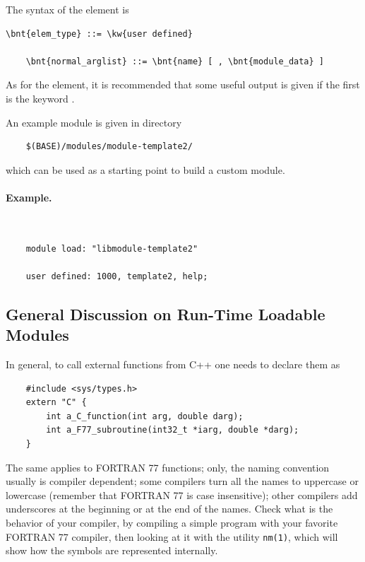 The syntax of the  element is
\begin{Verbatim}[commandchars=\\\{\}]
    \bnt{elem_type} ::= \kw{user defined}

    \bnt{normal_arglist} ::= \bnt{name} [ , \bnt{module_data} ]
\end{Verbatim}
As for the  element, it is recommended that 
some useful output is given if the first 
is the keyword .

An example module is given in directory
\begin{verbatim}
    $(BASE)/modules/module-template2/
\end{verbatim}
which can be used as a starting point to build a custom module.

\paragraph{Example.} \
\begin{verbatim}
    module load: "libmodule-template2"

    user defined: 1000, template2, help;
\end{verbatim}



\subsection{General Discussion on Run-Time Loadable Modules}
In general, to call external functions from C++ one needs
to declare them as
\begin{verbatim}
    #include <sys/types.h>
    extern "C" {
        int a_C_function(int arg, double darg);
        int a_F77_subroutine(int32_t *iarg, double *darg);
    }
\end{verbatim}
The same applies to FORTRAN 77 functions; only, the naming convention
usually is compiler dependent; some compilers turn all the names to 
uppercase or lowercase (remember that FORTRAN 77 is case insensitive);
other compilers add underscores at the beginning or at the end of the
names.
Check what is the behavior of your compiler, by compiling a simple 
program with your favorite FORTRAN 77 compiler, then looking at it
with the utility \texttt{nm(1)}, which will show how the symbols are represented 
internally.

